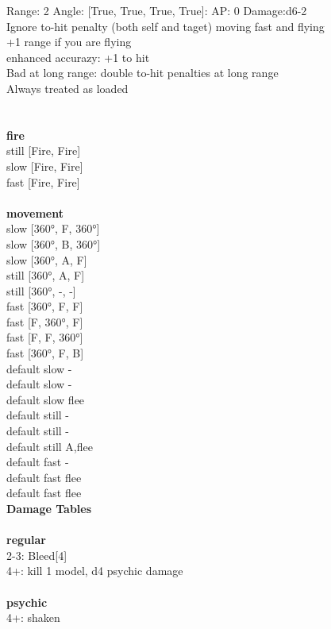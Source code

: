 Range: 2  Angle: [True, True, True, True]: AP: 0 Damage:d6-2 \\
Ignore to-hit penalty (both self and taget) moving fast and flying\\ 
+1 range if you are flying\\ 
enhanced accurazy: +1 to hit\\ 
Bad at long range: double to-hit penalties at long range\\ 
Always treated as loaded\\ 




 
\ \\



\ \\ {\bf fire } \\
still [Fire, Fire] \\
slow [Fire, Fire] \\
fast [Fire, Fire] \\
\ \\ {\bf movement } \\
slow [360°, F, 360°] \\
slow [360°, B, 360°] \\
slow [360°, A, F] \\
still [360°, A, F] \\
still [360°, -, -] \\
fast [360°, F, F] \\
fast [F, 360°, F] \\
fast [F, F, 360°] \\
fast [360°, F, B] \\
default slow - \\
default slow - \\
default slow flee \\
default still - \\
default still - \\
default still A,flee \\
default fast - \\
default fast flee \\
default fast flee \\


{\bf Damage Tables} \\
\ \\ {\bf regular } \\
2-3: Bleed[4] \\
4+: kill 1 model, d4 psychic damage \\
\ \\ {\bf psychic } \\
4+: shaken \\











